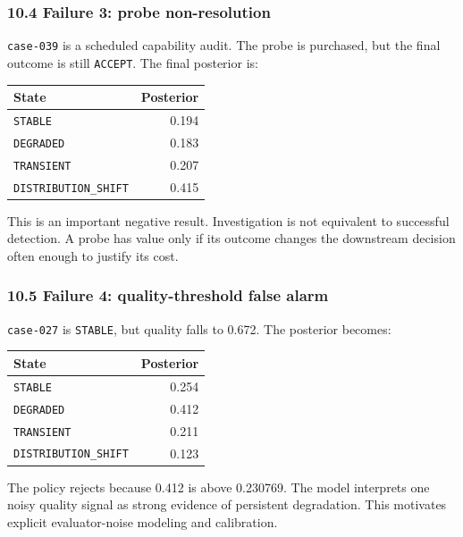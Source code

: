 \documentclass[
]{article}
\begin{document}
\subsubsection{10.4 Failure 3: probe
non-resolution}\label{failure-3-probe-non-resolution}

\texttt{case-039} is a scheduled capability audit. The probe is
purchased, but the final outcome is still \texttt{ACCEPT}. The final
posterior is:

\begin{longtable}[]{@{}lr@{}}
\toprule\noalign{}
State & Posterior \\
\midrule\noalign{}
\endhead
\bottomrule\noalign{}
\endlastfoot
\texttt{STABLE} & 0.194 \\
\texttt{DEGRADED} & 0.183 \\
\texttt{TRANSIENT} & 0.207 \\
\texttt{DISTRIBUTION\_SHIFT} & 0.415 \\
\end{longtable}

This is an important negative result. Investigation is not equivalent to
successful detection. A probe has value only if its outcome changes the
downstream decision often enough to justify its cost.

\subsubsection{10.5 Failure 4: quality-threshold false
alarm}\label{failure-4-quality-threshold-false-alarm}

\texttt{case-027} is \texttt{STABLE}, but quality falls to 0.672. The
posterior becomes:

\begin{longtable}[]{@{}lr@{}}
\toprule\noalign{}
State & Posterior \\
\midrule\noalign{}
\endhead
\bottomrule\noalign{}
\endlastfoot
\texttt{STABLE} & 0.254 \\
\texttt{DEGRADED} & 0.412 \\
\texttt{TRANSIENT} & 0.211 \\
\texttt{DISTRIBUTION\_SHIFT} & 0.123 \\
\end{longtable}

The policy rejects because 0.412 is above 0.230769. The model interprets
one noisy quality signal as strong evidence of persistent degradation.
This motivates explicit evaluator-noise modeling and calibration.
\end{document}
